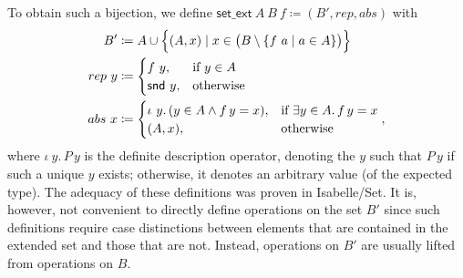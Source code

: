 \documentclass{article}
\newcommand{\juli}[1]{\textcolor{orange}{\textbf{Juli}: #1}}
\theoremstyle{definition}
\newcommand{\snd}{\mathsf{snd}}
\begin{document}
To obtain such a bijection,
we define \(\mathsf{set\_ext}\ A\ B\ f \coloneqq (B', rep, abs)\)
with
\begin{align}
	B' &\coloneqq A \cup \Bigl\{(A, x) \mid x \in \bigl(B \setminus \{f\ a \mid a \in A\}\bigr)\Bigr\} \\
  rep\ y &\coloneqq
    \begin{cases}
      f\ y,& \text{if}\ y \in A \\
      \snd\ y,& \text{otherwise }
    \end{cases}\\
	abs\ x &\coloneqq
    \begin{cases}
      \iota\ y.\, (y\in A\land f\, y = x),& \text{if}\ \exists y \in A.\, f\, y=x \\
      (A, x),& \text{otherwise }
    \end{cases},
\end{align}
where $\iota\ y.\, P\, y$ is the definite description operator,
denoting the $y$ such that $P\, y$ if such a unique $y$ exists;
otherwise, it denotes an arbitrary value (of the expected type).
The adequacy of these definitions was proven in Isabelle/Set.
It is, however, not convenient to directly define operations on the set \(B'\)
since such definitions require case distinctions between elements that are contained in the extended set and those that are not.
Instead, operations on \(B'\) are usually lifted from operations on $B$.
\end{document}
